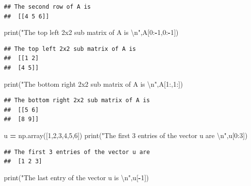 \documentclass[
]{book}
\newenvironment{Shaded}{\begin{snugshade}}{\end{snugshade}}
\newcommand{\BuiltInTok}[1]{#1}
\newcommand{\CharTok}[1]{\textcolor[rgb]{0.31,0.60,0.02}{#1}}
\newcommand{\DecValTok}[1]{\textcolor[rgb]{0.00,0.00,0.81}{#1}}
\newcommand{\NormalTok}[1]{#1}
\newcommand{\OperatorTok}[1]{\textcolor[rgb]{0.81,0.36,0.00}{\textbf{#1}}}
\newcommand{\StringTok}[1]{\textcolor[rgb]{0.31,0.60,0.02}{#1}}
\theoremstyle{definition}
\theoremstyle{definition}
\theoremstyle{definition}
\theoremstyle{remark}
\begin{document}
\begin{verbatim}
## The second row of A is 
##  [[4 5 6]]
\end{verbatim}

\begin{Shaded}
\begin{Highlighting}[]
\BuiltInTok{print}\NormalTok{(}\StringTok{"The top left 2x2 sub matrix of A is }\CharTok{\textbackslash{}n}\StringTok{"}\NormalTok{,A[}\DecValTok{0}\NormalTok{:}\OperatorTok{{-}}\DecValTok{1}\NormalTok{,}\DecValTok{0}\NormalTok{:}\OperatorTok{{-}}\DecValTok{1}\NormalTok{])}
\end{Highlighting}
\end{Shaded}

\begin{verbatim}
## The top left 2x2 sub matrix of A is 
##  [[1 2]
##  [4 5]]
\end{verbatim}

\begin{Shaded}
\begin{Highlighting}[]
\BuiltInTok{print}\NormalTok{(}\StringTok{"The bottom right 2x2 sub matrix of A is }\CharTok{\textbackslash{}n}\StringTok{"}\NormalTok{,A[}\DecValTok{1}\NormalTok{:,}\DecValTok{1}\NormalTok{:])}
\end{Highlighting}
\end{Shaded}

\begin{verbatim}
## The bottom right 2x2 sub matrix of A is 
##  [[5 6]
##  [8 9]]
\end{verbatim}

\begin{Shaded}
\begin{Highlighting}[]
\NormalTok{u }\OperatorTok{=}\NormalTok{ np.array([}\DecValTok{1}\NormalTok{,}\DecValTok{2}\NormalTok{,}\DecValTok{3}\NormalTok{,}\DecValTok{4}\NormalTok{,}\DecValTok{5}\NormalTok{,}\DecValTok{6}\NormalTok{])}
\BuiltInTok{print}\NormalTok{(}\StringTok{"The first 3 entries of the vector u are }\CharTok{\textbackslash{}n}\StringTok{"}\NormalTok{,u[}\DecValTok{0}\NormalTok{:}\DecValTok{3}\NormalTok{])}
\end{Highlighting}
\end{Shaded}

\begin{verbatim}
## The first 3 entries of the vector u are 
##  [1 2 3]
\end{verbatim}

\begin{Shaded}
\begin{Highlighting}[]
\BuiltInTok{print}\NormalTok{(}\StringTok{"The last entry of the vector u is }\CharTok{\textbackslash{}n}\StringTok{"}\NormalTok{,u[}\OperatorTok{{-}}\DecValTok{1}\NormalTok{])}
\end{Highlighting}
\end{Shaded}
\end{document}
